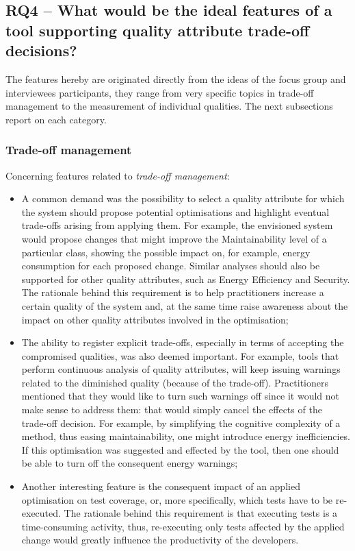 \subsection{RQ4 -- What would be the ideal features of a tool supporting quality attribute trade-off decisions?}
The features hereby are originated directly from the ideas of the focus group and interviewees participants, they range from very specific topics in trade-off management to the measurement of individual qualities.
The next subsections report on each category.

\subsubsection{Trade-off management}
Concerning features related to \textit{trade-off management}:
\begin{itemize}
    \item A common demand was the possibility to select a quality attribute for which the system should propose potential optimisations and highlight eventual trade-offs arising from applying them.
    For example, the envisioned system would propose changes that might improve the Maintainability level of a particular class, showing the possible impact on, for example, energy consumption for each proposed change.
    Similar analyses should also be supported for other quality attributes, such as Energy Efficiency and Security.
    The rationale behind this requirement is to help practitioners increase a certain quality of the system and, at the same time raise awareness about the impact on other quality attributes involved in the optimisation;

    \item The ability to register explicit trade-offs, especially in terms of accepting the compromised qualities, was also deemed important. For example, tools that perform continuous analysis of quality attributes, will keep issuing warnings related to the diminished quality (because of the trade-off). Practitioners mentioned that they would like to turn such warnings off since it would not make sense to address them: that would simply cancel the effects of the trade-off decision.
    For example, by simplifying the cognitive complexity of a method, thus easing maintainability, one might introduce energy inefficiencies.
    If this optimisation was suggested and effected by the tool, then one should be able to turn off the consequent energy warnings;

    \item Another interesting feature is the consequent impact of an applied optimisation on test coverage, or, more specifically, which tests have to be re-executed.
    The rationale behind this requirement is that executing tests is a time-consuming activity, thus, re-executing only tests affected by the applied change would greatly influence the productivity of the developers.
    

\end{itemize}
